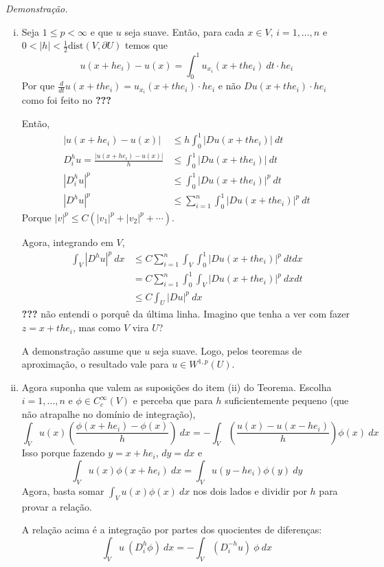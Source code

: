 \documentclass[a4paper, 11pt]{article}
\newcommand{\pu}{\partial U}
\begin{document}
\textit{Demonstração.}
\begin{enumerate}[(i)]
	\item Seja $1 \leq p < \infty$ e que $u$ seja suave. Então, para cada $x \in V$, $i = 1,\ldots,n$ e $0<|h|<\frac{1}{2}\text{dist}(V, \pu)$ temos que \[
	u(x+ he_i) - u(x) = \int_0^1 u_{x_i}(x + the_i)\ dt \cdot he_i	
	\]
	Por que $\frac{d}{dt}u(x+the_i) = u_{x_i}(x + the_i) \cdot he_i $ e não $Du(x+the_i)\cdot he_i$ como foi feito no  \textbf{???}

	Então, \begin{align*}
		|u(x+he_i)-u(x)| &\leq h \int_0^1 |Du(x+the_i)|\ dt	\\
		D^h_iu = \frac{|u(x+he_i)-u(x)|}{h} &\leq \int_0^1 |Du(x+the_i)|\ dt	\\
		|D^h_iu|^p &\leq \int_0^1 |Du(x+the_i)|^p \ dt	\\
		|D^h u |^p &\leq \sum_{i=1}^n \int_0^1 |Du(x+the_i)|^p \ dt
	\end{align*}
	Porque $|v|^p \leq C (|v_1|^p + |v_2|^p + \cdots)$.

	Agora, integrando em $V$,
	\begin{align*}
		\int_V |D^h u |^p\ dx &\leq C \sum_{i=1}^n \int_V \int_0^1 |Du(x+the_i)|^p \ dt dx \\
		&= C \sum_{i=1}^n \int_0^1 \int_V |Du(x+the_i)|^p\ dx dt \\
		&\leq C \int_U |Du|^p\ dx
	\end{align*}
	\textbf{???} não entendi o porquê da última linha. Imagino que tenha a ver com fazer $z=x+the_i$, mas como $V$ vira $U$?

	A demonstração assume que $u$ seja suave. Logo, pelos teoremas de aproximação, o resultado vale para $u \in W^{1,p}(U)$.
	
	\item Agora suponha que valem as suposições do item (ii) do Teorema. Escolha $i=1,\ldots,n$ e $\phi \in C^\infty_c(V)$ e perceba que para $h$ suficientemente pequeno (que não atrapalhe no domínio de integração), \[
	\int_V u(x) \left( \frac{\phi(x+he_i) - \phi(x)}{h} \right)\ dx = - \int_V \left( \frac{u(x) - u(x-he_i)}{h} \right) \phi(x)\ dx
	\]
	Isso porque fazendo $y=x+he_i$, $dy=dx$ e \[
		\int_V u(x)\phi(x+he_i)\ dx = \int_V u(y - he_i)\phi(y)\ dy
	\] Agora, basta somar $\int_V u(x)\phi(x)\ dx$ nos dois lados e dividir por $h$ para provar a relação.
	
	A relação acima é a integração por partes dos quocientes de diferenças: \begin{equation}\label{intpartes-quocientes}
		\int_V u\ ( D_i^h \phi )\ dx = - \int_V (D_i^{-h}u)\ \phi \ dx 
	\end{equation}


\end{enumerate}
\end{document}
